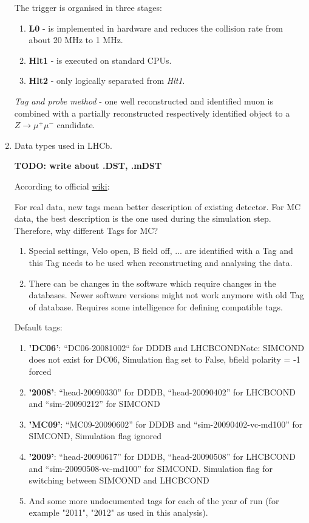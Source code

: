 \documentclass[11pt,a4paper,twoside]{article}
\begin{document}
\begin{enumerate}
        The trigger is organised in three stages:
        \begin{enumerate}
            \item \textbf{L0} - is implemented in hardware and reduces the collision rate from about 20 MHz to 1 MHz.
            \item \textbf{Hlt1} - is executed on standard CPUs.
            \item \textbf{Hlt2} - only logically separated from \textit{Hlt1}. 
        \end{enumerate}


        \textit{Tag and probe method} - one well reconstructed and identified muon is combined with a partially reconstructed respectively identified object to a $Z \longrightarrow \mu^{+} \mu^{-}$ candidate.


        \item Data types used in LHCb.

        \textbf{TODO: write about .DST, .mDST}

        According to official \hyperlink{https://twiki.cern.ch/twiki/bin/view/LHCb/RecommendedTags}{wiki}:

        For real data, new tags mean better description of existing detector. For MC data, the best description is the one used during the simulation step. Therefore, why different Tags for MC?

        \begin{enumerate}
            \item Special settings, Velo open, B field off, ... are identified with a Tag and this Tag needs to be used when reconstructing and analysing the data.
            \item There can be changes in the software which require changes in the databases. Newer software versions might not work anymore with old Tag of database. Requires some intelligence for defining compatible tags.
        \end{enumerate}


        Default tags:
        \begin{enumerate}
            \item \textbf{'DC06'}: “DC06-20081002“ for DDDB and LHCBCONDNote: SIMCOND does not exist for DC06, Simulation flag set to False, bfield polarity = -1 forced
            \item \textbf{'2008'}: “head-20090330” for DDDB, “head-20090402” for LHCBCOND and “sim-20090212” for SIMCOND
            \item \textbf{'MC09'}: “MC09-20090602” for DDDB and “sim-20090402-vc-md100” for SIMCOND, Simulation flag ignored
            \item \textbf{'2009'}: “head-20090617” for DDDB, “head-20090508” for LHCBCOND and “sim-20090508-vc-md100” for SIMCOND. Simulation flag for switching between SIMCOND and LHCBCOND
            \item And some more undocumented tags for each of the year of run (for example "2011", "2012" as used in this analysis).
        \end{enumerate}

        
    \end{enumerate}
\end{document}
